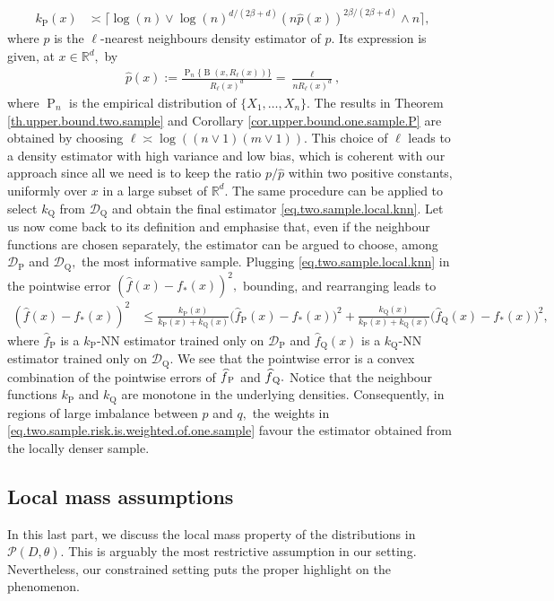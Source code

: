 \documentclass[10pt]{article}
\newcommand{\mD}{\mathcal{D}}
\newcommand{\mP}{\mathcal{P}}
\newcommand{\RR}{\mathbb{R}}
\newcommand{\B}{\operatorname{B}}
\renewcommand{\P}{\operatorname{P}}
\newcommand{\Q}{\operatorname{Q}}
\newcommand{\wh}{\widehat}
\begin{document}
\begin{align*}
    k_{\P}(x) &\asymp \Big\lceil \log(n) \vee \log(n)^{d/(2\beta + d)}(n\wh p(x))^{2\beta/(2\beta + d)} \wedge n\Big\rceil,
\end{align*}
where $\wh p$ is the $\ell$-nearest neighbours density estimator of $p$. Its expression is given, at $x \in \RR^d,$ by
\begin{align}\label{eq.density.estimator}
    \wh p(x):= \frac{\P_n\{\B(x, R_{\ell}(x))\}}{R_{\ell}(x)^d} = \frac{\ell}{nR_\ell(x)^d},
\end{align}
where $\P_n$ is the empirical distribution of $\{X_1, \dots, X_n\}.$ The results in Theorem \ref{th.upper.bound.two.sample} and Corollary \ref{cor.upper.bound.one.sample.P} are obtained by choosing $\ell \asymp \log((n\vee 1)(m\vee 1)).$ This choice of $\ell$ leads to a density estimator with high variance and low bias, which is coherent with our approach since all we need is to keep the ratio $p/\wh p$ within two positive constants, uniformly over $x$ in a large subset of $\RR^d$. The same procedure can be applied to select $k_{\Q}$ from $\mD_{\Q}$ and obtain the final estimator \eqref{eq.two.sample.local.knn}. Let us now come back to its definition and emphasise that, even if the neighbour functions are chosen separately, the estimator can be argued to choose, among $\mD_{\P}$ and $\mD_{\Q},$ the most informative sample. Plugging \eqref{eq.two.sample.local.knn} in the pointwise error $(\wh f(x) - f_*(x))^2,$ bounding, and rearranging leads to
\begin{align}
   \label{eq.two.sample.risk.is.weighted.of.one.sample}
    (\wh f(x) - f_*(x))^2 &\leq \frac{k_{\P}(x)}{k_{\P}(x) + k_{\Q}(x)}\big(\wh f_{\P}(x) - f_*(x)\big)^2 + \frac{k_{\Q}(x)}{k_{\P}(x) + k_{\Q}(x)}\big(\wh f_{\Q}(x) - f_*(x)\big)^2,
\end{align}
where $\wh f_{\P}$ is a $k_{\P}$-NN estimator trained only on $\mD_{\P}$ and $\wh f_{\Q}(x)$ is a $k_{\Q}$-NN estimator trained only on $\mD_{\Q}.$ We see that the pointwise error is a convex combination of the pointwise errors of $\smash{\wh f}_{\P}$ and $\smash{\wh f}_{\Q}.$ Notice that the neighbour functions $k_{\P}$ and $k_{\Q}$ are monotone in the underlying densities. Consequently, in regions of large imbalance between $p$ and $q,$ the weights in \eqref{eq.two.sample.risk.is.weighted.of.one.sample} favour the estimator obtained from the locally denser sample.


\subsection{Local mass assumptions}
\label{sec.4.3}
In this last part, we discuss the local mass property of the distributions in $\mP(D, \theta).$ This is arguably the most restrictive assumption in our setting. Nevertheless, our constrained setting puts the proper highlight on the phenomenon.\\
\end{document}

